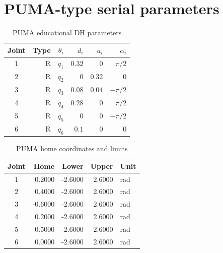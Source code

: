 \section{PUMA-type serial parameters}
\begin{table}[H]\centering
\caption{PUMA educational DH parameters}
\begin{tabular}{crrrrr}\toprule
Joint & Type & $\theta_i$ & $d_i$ & $a_i$ & $\alpha_i$\\\midrule
1&R&$q_1$&$0.32$&$0$&$\pi/2$\\
2&R&$q_2$&$0$&$0.32$&$0$\\
3&R&$q_3$&$0.08$&$0.04$&$-\pi/2$\\
4&R&$q_4$&$0.28$&$0$&$\pi/2$\\
5&R&$q_5$&$0$&$0$&$-\pi/2$\\
6&R&$q_6$&$0.1$&$0$&$0$\\
\bottomrule\end{tabular}\end{table}
\begin{table}[H]\centering
\caption{PUMA home coordinates and limits}
\begin{tabular}{crrrl}\toprule Joint & Home & Lower & Upper & Unit\\\midrule
1&0.2000&-2.6000&2.6000&rad\\
2&0.4000&-2.6000&2.6000&rad\\
3&-0.6000&-2.6000&2.6000&rad\\
4&0.2000&-2.6000&2.6000&rad\\
5&0.5000&-2.6000&2.6000&rad\\
6&0.0000&-2.6000&2.6000&rad\\
\bottomrule\end{tabular}\end{table}
\clearpage
